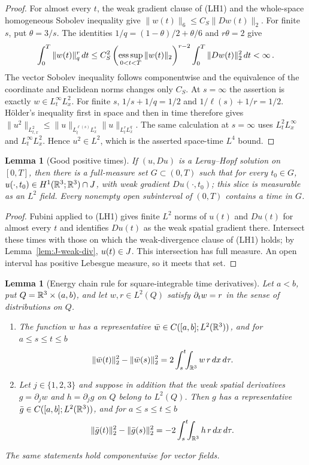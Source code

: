 \documentclass[11pt,letterpaper]{article}
\numberwithin{equation}{section}
\theoremstyle{plain}
\newtheorem{lemma}[theorem]{Lemma}
\theoremstyle{definition}
\theoremstyle{remark}
\begin{document}
\begin{proof}
For almost every $t$, the weak gradient clause of (LH1) and the
whole-space homogeneous Sobolev inequality give
$\|w(t)\|_6\le C_S\|Dw(t)\|_2$. For finite $s$, put
$\theta=3/s$. The identities
$1/q=(1-\theta)/2+\theta/6$ and $r\theta=2$ give
\begin{equation}\label{eq:lps-energy-interpolation}
\int_0^T\|w(t)\|_q^r\,dt
\le C_S^2\left(\operatorname*{ess\,sup}_{0<t<T}\|w(t)\|_2\right)^{r-2}
       \int_0^T\|Dw(t)\|_2^2\,dt<\infty\,.
\end{equation}
The vector Sobolev inequality follows componentwise and the equivalence of
the coordinate and Euclidean norms changes only $C_S$. At $s=\infty$ the
assertion is exactly $w\in L^\infty_tL^2_x$.
For finite $s$, $1/s+1/q=1/2$ and $1/\ell(s)+1/r=1/2$.
H\"older's inequality first in space and then in time therefore gives
$\|u^2\|_{L^2_{t,x}}\le
\|u\|_{L^{\ell(s)}_tL^s_x}\|u\|_{L^r_tL^q_x}$.
The same calculation at $s=\infty$ uses
$L^2_tL^\infty_x$ and $L^\infty_tL^2_x$. Hence $u^2\in L^2$,
which is the asserted space-time $L^4$ bound.
\end{proof}

\begin{lemma}[Good positive times]\label{lem:lps-good-times}
If $(u,Du)$ is a Leray--Hopf solution on $[0,T]$, then there is a
full-measure set $G\subset(0,T)$ such that for every $t_0\in G$,
$u(\cdot,t_0)\in H^1(\mathbb{R}^3;\mathbb{R}^3)\cap J$, with weak gradient
$Du(\cdot,t_0)$; this slice is measurable as an $L^2$ field.
Every nonempty open subinterval of $(0,T)$ contains a time in $G$.
\end{lemma}

\begin{proof}
Fubini applied to (LH1) gives finite $L^2$ norms of $u(t)$ and
$Du(t)$ for almost every $t$ and identifies $Du(t)$ as the weak
spatial gradient there. Intersect these times with those on which the
weak-divergence clause of (LH1) holds; by
Lemma~\ref{lem:J-weak-div}, $u(t)\in J$. This intersection has full
measure. An open interval has positive Lebesgue measure, so it meets
that set.
\end{proof}

\begin{lemma}[Energy chain rule for square-integrable time derivatives]\label{lem:lps-Hilbert-triple}
Let $a<b$, put $Q=\mathbb{R}^3\times(a,b)$, and let $w,r\in L^2(Q)$ satisfy
$\partial_t w=r$ in the sense of distributions on $Q$.
\begin{enumerate}[label=(\roman*)]
\item The function $w$ has a representative $\bar w\in C([a,b];L^2(\mathbb{R}^3))$,
and for $a\le s\le t\le b$
\[
\|\bar w(t)\|_2^2-\|\bar w(s)\|_2^2
=2\int_s^t\!\!\int_{\mathbb{R}^3}w\,r\,dx\,d\tau .
\]
\item Let $j\in\{1,2,3\}$ and suppose in addition that the weak spatial
derivatives $g=\partial_jw$ and $h=\partial_jg$ on $Q$ belong to $L^2(Q)$.
Then $g$ has a representative $\bar g\in C([a,b];L^2(\mathbb{R}^3))$, and for
$a\le s\le t\le b$
\[
\|\bar g(t)\|_2^2-\|\bar g(s)\|_2^2
=-2\int_s^t\!\!\int_{\mathbb{R}^3}h\,r\,dx\,d\tau .
\]
\end{enumerate}
The same statements hold componentwise for vector fields.
\end{lemma}
\end{document}
